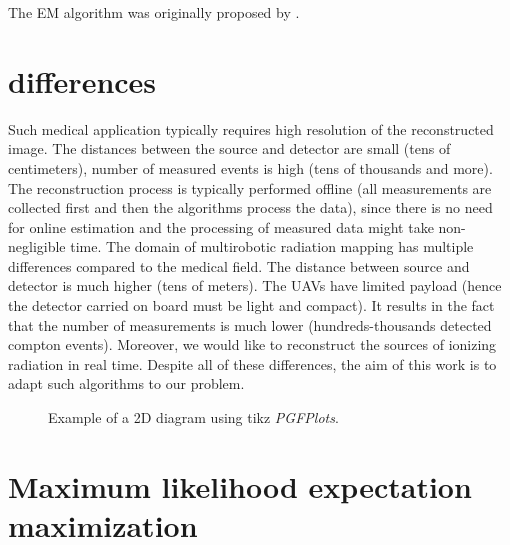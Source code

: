 The \ac{EM} algorithm was originally proposed by \cite{EM}. 























\section{differences}
Such medical application typically requires high resolution of the reconstructed image.
The distances between the source and detector are small (tens of centimeters), number of measured events is high (tens of thousands and more).
The reconstruction process is typically performed offline (all measurements are collected first and then the algorithms process the data), since there is no need for online estimation and the processing of measured data might take non-negligible time.
The domain of multirobotic radiation mapping has multiple differences compared to the medical field.
The distance between source and detector is much higher (tens of meters).
The \ac{UAV}s have limited payload (hence the detector carried on board must be light and compact).
It results in the fact that the number of measurements is much lower (hundreds-thousands detected compton events).
Moreover, we would like to reconstruct the sources of ionizing radiation in real time.
Despite all of these differences, the aim of this work is to adapt such algorithms to our problem.



\begin{figure}[!h]
  \centering

  \begin{adjustbox}{max totalsize={0.6\textwidth}{0.90\textheight}, center}
    
  \end{adjustbox}

  \caption{Example of a 2D diagram using tikz \emph{PGFPlots}.}
  \label{fig:pgfplots}
\end{figure}

\section{Maximum likelihood expectation maximization}







